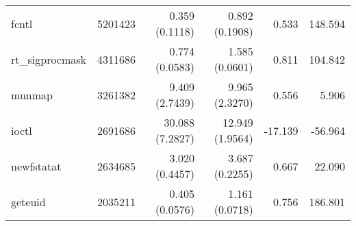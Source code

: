 \begin{tabular}{>{\ttfamily}lrrrrr}
                          fcntl &    5201423 &           0.359 (0.1118) &           0.892 (0.1908) &           0.533 &      148.594 \\
                rt\_sigprocmask &    4311686 &           0.774 (0.0583) &           1.585 (0.0601) &           0.811 &      104.842 \\
                         munmap &    3261382 &           9.409 (2.7439) &           9.965 (2.3270) &           0.556 &        5.906 \\
                          ioctl &    2691686 &          30.088 (7.2827) &          12.949 (1.9564) &         -17.139 &      -56.964 \\
                     newfstatat &    2634685 &           3.020 (0.4457) &           3.687 (0.2255) &           0.667 &       22.090 \\
                        geteuid &    2035211 &           0.405 (0.0576) &           1.161 (0.0718) &           0.756 &      186.801 \\
\bottomrule
\end{tabular}
